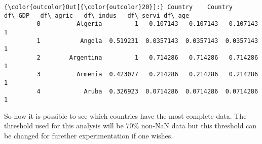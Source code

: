 \documentclass[11pt]{article}
\begin{document}
\begin{Verbatim}[commandchars=\\\{\}]
{\color{outcolor}Out[{\color{outcolor}20}]:} Country    Country    df\_GDP   df\_agric   df\_indus   df\_servi df\_age
         0          Algeria         1   0.107143   0.107143   0.107143      1
         1           Angola  0.519231  0.0357143  0.0357143  0.0357143      1
         2        Argentina         1   0.714286   0.714286   0.714286      1
         3          Armenia  0.423077   0.214286   0.214286   0.214286      1
         4            Aruba  0.326923  0.0714286  0.0714286  0.0714286      1
\end{Verbatim}
            
    So now it is possible to see which countries have the most complete
data. The threshold used for this analysis will be 70\% non-NaN data but
this threshold can be changed for furether experimentation if one
wishes.
\end{document}
